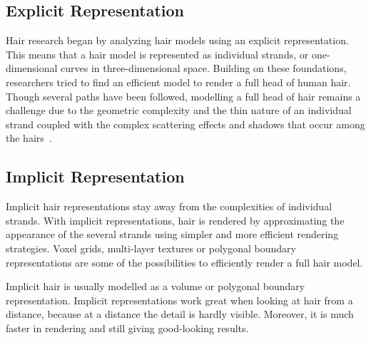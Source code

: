 \documentclass[11pt,a4paper]{report}
\begin{document}
\subsection{Explicit Representation}

Hair research began by analyzing hair models using an explicit representation. This means that a hair model is represented as individual strands, or one-dimensional curves in three-dimensional space. Building on these foundations, researchers tried to find an efficient model to render a full head of human hair. Though several paths have been followed, modelling a full head of hair remains a challenge due to the geometric complexity and the thin nature of an individual strand coupled with the complex scattering effects and shadows that occur among the hairs~\cite{ward}.

\subsection{Implicit Representation}

Implicit hair representations stay away from the complexities of individual strands. With implicit representations, hair is rendered by approximating the appearance of the several strands using simpler and more efficient rendering strategies. Voxel grids, multi-layer textures or polygonal boundary representations are some of the possibilities to efficiently render a full hair model.

Implicit hair is usually modelled as a volume or polygonal boundary representation. Implicit representations work great when looking at hair from a distance, because at a distance the detail is hardly visible. Moreover, it is much faster in rendering and still giving good-looking results.


\end{document}
